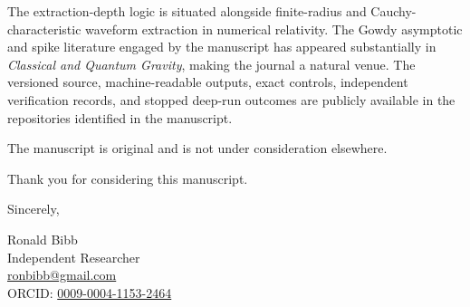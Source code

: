 \documentclass[11pt]{article}
\begin{document}
The extraction-depth logic is situated alongside finite-radius and
Cauchy-characteristic waveform extraction in numerical relativity. The Gowdy
asymptotic and spike literature engaged by the manuscript has appeared
substantially in
\textit{Classical and Quantum Gravity}, making the journal a natural venue.
The versioned source, machine-readable outputs, exact controls, independent
verification records, and stopped deep-run outcomes are publicly available in
the repositories identified in the manuscript.

The manuscript is original and is not under consideration elsewhere.

Thank you for considering this manuscript.

Sincerely,

\vspace{14pt}

Ronald Bibb\\
Independent Researcher\\
\href{mailto:ronbibb@gmail.com}{ronbibb@gmail.com}\\
ORCID: \href{https://orcid.org/0009-0004-1153-2464}{0009-0004-1153-2464}
\end{document}
